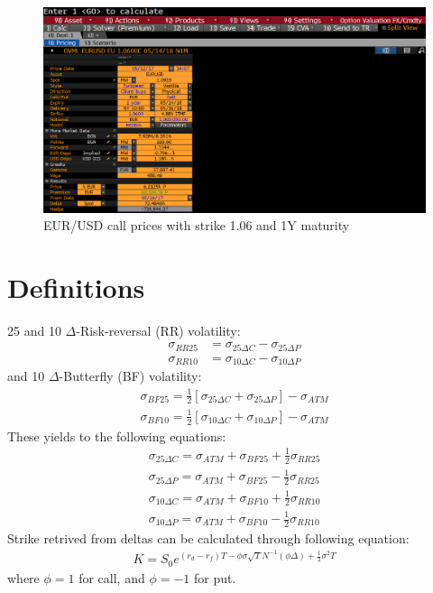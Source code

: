 \begin{figure}[htb]
	\centering
	\includegraphics[scale=0.3]{./Testing-data/Heston-prices/May12EURUSD1Y/eurusd106HESTON1Y.png} 
	\caption{EUR/USD call prices with strike 1.06 and 1Y maturity}
	
	\label{fig:prices-investing.com-1Y-Heston} %
\end{figure}
\newpage
\section{Definitions}
25 and 10 $\Delta$-Risk-reversal (RR) volatility:
\begin{align}
\sigma_{RR25}&=\sigma_{25\Delta C}-\sigma_{25\Delta P}\\
\sigma_{RR10}&=\sigma_{10\Delta C}-\sigma_{10\Delta P}
\end{align}
 and 10 $\Delta$-Butterfly (BF) volatility:
\begin{align}
\sigma_{BF25}=\frac{1}{2}\left[\sigma_{25\Delta C}+\sigma_{25\Delta P}\right]-\sigma_{ATM}\\
\sigma_{BF10}=\frac{1}{2}\left[\sigma_{10\Delta C}+\sigma_{10\Delta P}\right]-\sigma_{ATM}
\end{align}
\newline
These yields to the following equations:
\begin{align}
\sigma_{25\Delta C}=\sigma_{ATM}+\sigma_{BF25}+\frac{1}{2}\sigma_{RR25}\\
\sigma_{25\Delta P}=\sigma_{ATM}+\sigma_{BF25}-\frac{1}{2}\sigma_{RR25}\\
\sigma_{10\Delta C}=\sigma_{ATM}+\sigma_{BF10}+\frac{1}{2}\sigma_{RR10}\\
\sigma_{10\Delta P}=\sigma_{ATM}+\sigma_{BF10}-\frac{1}{2}\sigma_{RR10}
\end{align}
\newline
Strike retrived from deltas can be calculated through following equation:
\begin{align}
K=S_0e^{(r_d-r_f)T-\phi \sigma \sqrt{T} N^{-1}(\phi \Delta)+\frac{1}{2}\sigma^2T}
\end{align}
where $\phi=1$ for call, and $\phi=-1$ for put.

